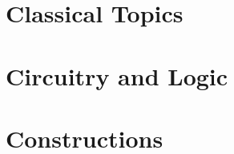\documentclass[11pt,twoside]{book}
\begin{document}
\pagestyle{fancy} %


\renewcommand{\chaptermark}[1]{\markboth{\sffamily\normalsize\bfseries Preface}{}} %





\mainmatter


\renewcommand{\chaptermark}[1]{\markboth{\sffamily\normalsize\bfseries\chaptername\ \thechapter.\ #1}{}} %



\part{Classical Topics}













\part{Circuitry and Logic}












\part{Constructions}
\end{document}

